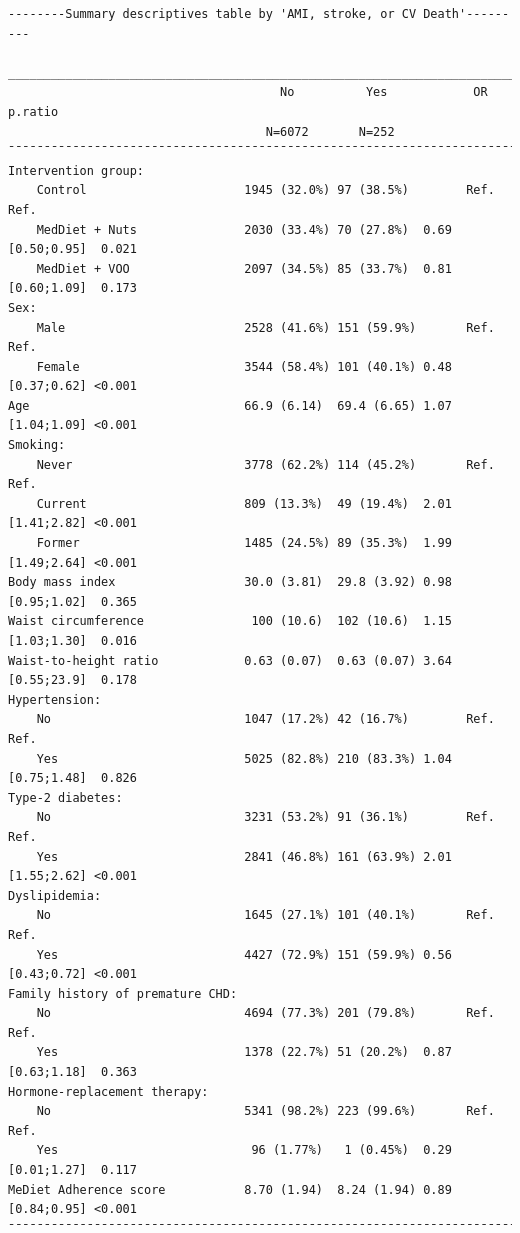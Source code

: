 \documentclass[
]{book}
\begin{document}
\begin{verbatim}
--------Summary descriptives table by 'AMI, stroke, or CV Death'---------

__________________________________________________________________________________ 
                                      No          Yes            OR        p.ratio 
                                    N=6072       N=252                             
¯¯¯¯¯¯¯¯¯¯¯¯¯¯¯¯¯¯¯¯¯¯¯¯¯¯¯¯¯¯¯¯¯¯¯¯¯¯¯¯¯¯¯¯¯¯¯¯¯¯¯¯¯¯¯¯¯¯¯¯¯¯¯¯¯¯¯¯¯¯¯¯¯¯¯¯¯¯¯¯¯¯ 
Intervention group:                                                                
    Control                      1945 (32.0%) 97 (38.5%)        Ref.        Ref.   
    MedDiet + Nuts               2030 (33.4%) 70 (27.8%)  0.69 [0.50;0.95]  0.021  
    MedDiet + VOO                2097 (34.5%) 85 (33.7%)  0.81 [0.60;1.09]  0.173  
Sex:                                                                               
    Male                         2528 (41.6%) 151 (59.9%)       Ref.        Ref.   
    Female                       3544 (58.4%) 101 (40.1%) 0.48 [0.37;0.62] <0.001  
Age                              66.9 (6.14)  69.4 (6.65) 1.07 [1.04;1.09] <0.001  
Smoking:                                                                           
    Never                        3778 (62.2%) 114 (45.2%)       Ref.        Ref.   
    Current                      809 (13.3%)  49 (19.4%)  2.01 [1.41;2.82] <0.001  
    Former                       1485 (24.5%) 89 (35.3%)  1.99 [1.49;2.64] <0.001  
Body mass index                  30.0 (3.81)  29.8 (3.92) 0.98 [0.95;1.02]  0.365  
Waist circumference               100 (10.6)  102 (10.6)  1.15 [1.03;1.30]  0.016  
Waist-to-height ratio            0.63 (0.07)  0.63 (0.07) 3.64 [0.55;23.9]  0.178  
Hypertension:                                                                      
    No                           1047 (17.2%) 42 (16.7%)        Ref.        Ref.   
    Yes                          5025 (82.8%) 210 (83.3%) 1.04 [0.75;1.48]  0.826  
Type-2 diabetes:                                                                   
    No                           3231 (53.2%) 91 (36.1%)        Ref.        Ref.   
    Yes                          2841 (46.8%) 161 (63.9%) 2.01 [1.55;2.62] <0.001  
Dyslipidemia:                                                                      
    No                           1645 (27.1%) 101 (40.1%)       Ref.        Ref.   
    Yes                          4427 (72.9%) 151 (59.9%) 0.56 [0.43;0.72] <0.001  
Family history of premature CHD:                                                   
    No                           4694 (77.3%) 201 (79.8%)       Ref.        Ref.   
    Yes                          1378 (22.7%) 51 (20.2%)  0.87 [0.63;1.18]  0.363  
Hormone-replacement therapy:                                                       
    No                           5341 (98.2%) 223 (99.6%)       Ref.        Ref.   
    Yes                           96 (1.77%)   1 (0.45%)  0.29 [0.01;1.27]  0.117  
MeDiet Adherence score           8.70 (1.94)  8.24 (1.94) 0.89 [0.84;0.95] <0.001  
¯¯¯¯¯¯¯¯¯¯¯¯¯¯¯¯¯¯¯¯¯¯¯¯¯¯¯¯¯¯¯¯¯¯¯¯¯¯¯¯¯¯¯¯¯¯¯¯¯¯¯¯¯¯¯¯¯¯¯¯¯¯¯¯¯¯¯¯¯¯¯¯¯¯¯¯¯¯¯¯¯¯ 
\end{verbatim}
\end{document}

